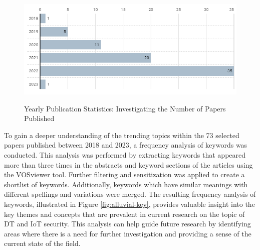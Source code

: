 \begin{figure}[H]    
    \caption{Yearly Publication Statistics: Investigating the Number of Papers Published}
    \includegraphics[width=\textwidth]{images/year8.png}
    \label{fig:bar-chart-yaer}
\end{figure}

To gain a deeper understanding of the trending topics within the 73 selected papers published between 2018 and 2023, a frequency analysis of keywords was conducted. This analysis was performed by extracting keywords that appeared more than three times in the abstracts and keyword sections of the articles using the VOSviewer tool. Further filtering and sensitization was applied to create a shortlist of keywords. Additionally, keywords which have similar meanings with different spellings and variations were merged. The resulting frequency analysis of keywords, illustrated in Figure \ref{fig:alluvial-key}, provides valuable insight into the key themes and concepts that are prevalent in current research on the topic of DT and IoT security. This analysis can help guide future research by identifying areas where there is a need for further investigation and providing a sense of the current state of the field.



